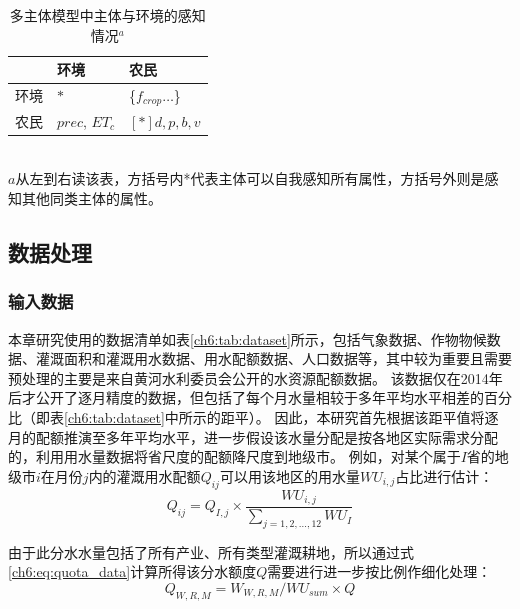 

\begin{table}[htbp]
    \centering
    \caption{多主体模型中主体与环境的感知情况$^a$}
      \begin{tabularx}{0.6\textwidth}{LLL}
      \toprule
            & 环境    & 农民 \\
      \midrule
      环境    & $*$     & \{$f_{crop} \dots$\} \\
      农民    & $prec$, $ET_c$ & $[*] d, p, b, v$ \\
      \bottomrule
      \end{tabularx}\label{ch6:tab:visa3}\\%
    \footnotesize{$a$从左到右读该表，方括号内*代表主体可以自我感知所有属性，方括号外则是感知其他同类主体的属性。}
\end{table}%


\subsection{数据处理}

\subsubsection{输入数据}

本章研究使用的数据清单如表\ref{ch6:tab:dataset}所示，包括气象数据、作物物候数据、灌溉面积和灌溉用水数据、用水配额数据、人口数据等，其中较为重要且需要预处理的主要是来自黄河水利委员会公开的水资源配额数据。
该数据仅在2014年后才公开了逐月精度的数据，但包括了每个月水量相较于多年平均水平相差的百分比（即表\ref{ch6:tab:dataset}中所示的距平）。
因此，本研究首先根据该距平值将逐月的配额推演至多年平均水平，进一步假设该水量分配是按各地区实际需求分配的，利用用水量数据将省尺度的配额降尺度到地级市。
例如，对某个属于$I$省的地级市$i$在月份$j$内的灌溉用水配额$Q_{ij}$可以用该地区的用水量$WU_{i, j}$占比进行估计：
\begin{equation}
    \label{ch6:eq:quota_data}
    Q_{ij} = Q_{I, j} \times \frac{WU_{i, j}}{\sum_{j = 1, 2, \dots, 12} WU_{I}}
\end{equation}

由于此分水水量包括了所有产业、所有类型灌溉耕地，所以通过式\ref{ch6:eq:quota_data}计算所得该分水额度$Q$需要进行进一步按比例作细化处理：
\begin{equation}
    Q_{W, R, M} = W_{W, R, M} / WU_{sum} \times Q
\end{equation}

